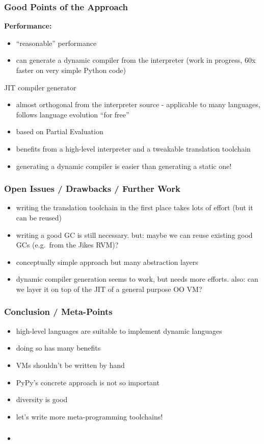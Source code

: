 \documentclass[utf8x]{beamer}
\begin{document}
\begin{frame}
  \frametitle{Good Points of the Approach}
  {\bf Performance:}

  \begin{itemize}
  \item
    ``reasonable'' performance
  \item
    can generate a dynamic compiler from the interpreter
    (work in progress, 60x faster on very simple Python code)
  \end{itemize}
  \pause
  \begin{block}{
    JIT compiler generator}
    \begin{itemize}
    \item
      almost orthogonal from the interpreter source - applicable to many
      languages, follows language evolution ``for free''
    \item
      based on Partial Evaluation
    \item
      benefits from a high-level interpreter and a tweakable translation
      toolchain
    \item
      generating a dynamic compiler is easier than generating a static one!
    \end{itemize}
  \end{block}
\end{frame}

\begin{frame}
  \frametitle{Open Issues / Drawbacks / Further Work}
  \begin{itemize}
  \item
    writing the translation toolchain in the first place takes lots of effort
    (but it can be reused)
  \item
    writing a good GC is still necessary. but: maybe we can reuse existing good
    GCs (e.g.\ from the Jikes RVM)?
  \item
    conceptually simple approach but many abstraction layers
  \item
    dynamic compiler generation seems to work, but needs more efforts.
    also: can we layer it on top of the JIT of a general purpose OO VM?
  \end{itemize}
\end{frame}

\begin{frame}
  \frametitle{Conclusion / Meta-Points}
  \begin{itemize}
  \item
    high-level languages are suitable to implement dynamic languages
  \item
    doing so has many benefits
  \item
    VMs shouldn't be written by hand
  \item
    PyPy's concrete approach is not so important
  \item
    diversity is good
  \item
    let's write more meta-programming toolchains!
  \end{itemize}
\end{frame}

\begin{frame}
  \frametitle{}
  \begin{itemize}
  \item
  \end{itemize}
\end{frame}
\end{document}
